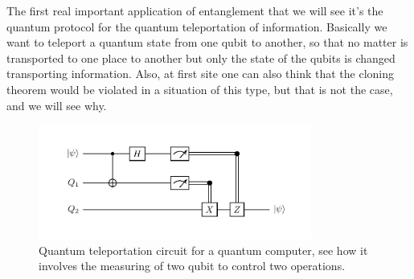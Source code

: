 The first real important application of entanglement that we will see it's the quantum protocol for the quantum teleportation of information. Basically we want to teleport a quantum state from one qubit to another, so that no matter is transported to one place to another but only the state of the qubits is changed transporting information. Also, at first site one can also think that the cloning theorem would be violated in a situation of this type, but that is not the case, and we will see why.
\begin{figure}[b]
    \centering
    \includegraphics[width=0.8\textwidth]{Immagini/QuanTeleport.pdf}
    \caption
    {
        Quantum teleportation circuit for a quantum computer, see how it involves the measuring of two qubit to control two operations.
    }
    \label{fig:QuanTeleport}
\end{figure}

